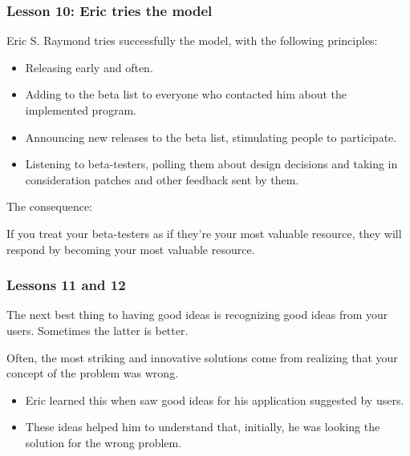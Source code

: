 \documentclass{beamer}
\begin{document}
\begin{frame}
\frametitle{Lesson 10: Eric tries the model}

Eric S. Raymond tries successfully the model, with the following
principles:
\begin{itemize}
\item Releasing early and often.
\item Adding to the beta list to everyone who contacted him about the
  implemented program.
\item Announcing new releases to the beta list, stimulating people to
  participate.
\item Listening to beta-testers, polling them about design decisions
  and taking in consideration patches and other feedback sent by them.
\end{itemize}

The consequence:
\begin{center}
{\large If you treat your beta-testers as if they're your most
  valuable resource, they will respond by becoming your most valuable
  resource.
}
\end{center}

\end{frame}

\begin{frame}
\frametitle{Lessons 11 and 12}

\begin{center}
{\large The next best thing to having good ideas is recognizing good
  ideas from your users. Sometimes the latter is better.
}
\end{center}

\begin{center}
{\large Often, the most striking and innovative solutions come from
  realizing that your concept of the problem was wrong.}
\end{center}

\begin{itemize}
\item Eric learned this when saw good ideas for his application
  suggested by users.
\item These ideas helped him to understand that, initially, he was
  looking the solution for the wrong problem.
\end{itemize}

\end{frame}
\end{document}
